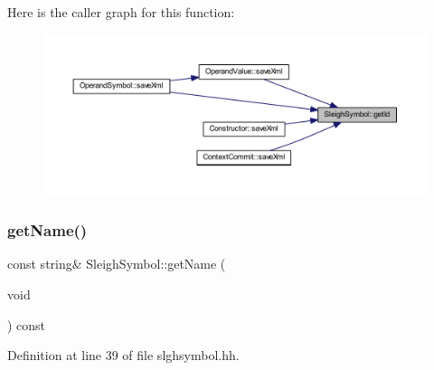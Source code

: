 Here is the caller graph for this function\+:
\nopagebreak
\begin{figure}[H]
\begin{center}
\leavevmode
\includegraphics[width=350pt]{class_sleigh_symbol_a48557f9371e94c4940c682720e9c81c1_icgraph}
\end{center}
\end{figure}
\mbox{\label{class_sleigh_symbol_a0a833d55302c4e1cfd77a7726b72a04a}} 
\subsubsection{\texorpdfstring{getName()}{getName()}}
{\footnotesize\ttfamily const string\& Sleigh\+Symbol\+::get\+Name (\begin{DoxyParamCaption}\item[{void}]{ }\end{DoxyParamCaption}) const\hspace{0.3cm}{\ttfamily [inline]}}



Definition at line 39 of file slghsymbol.\+hh.

